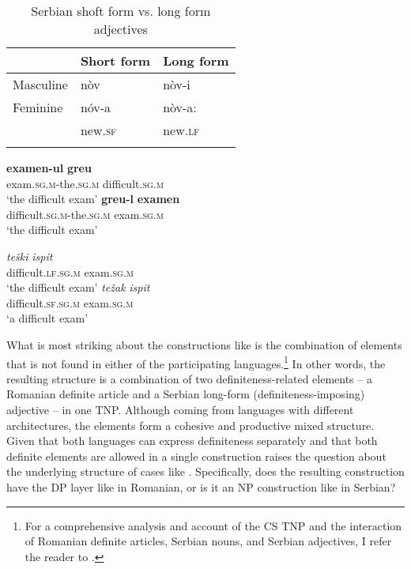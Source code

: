\documentclass[output=paper,hidelinks,newtxmath,]{langscibook}
\begin{document}
\begin{table}
    \centering
\begin{tabularx}{0.6\textwidth}{lXX}
  \lsptoprule
  & \textbf{Short form}&\textbf{Long form}\\\midrule
  Masculine & nòv & nòv-i\\
  Feminine & nóv-a & nòv-a:\\
  & new.\textsc{sf} & new.\textsc{lf}\\
  \lspbottomrule
\end{tabularx}
  \caption{Serbian shoft form vs. long form adjectives}\label{15:t1}
\end{table}


\ea \label{15:ex12}
	\ea\label{15:ex12a}
    \gll \textbf{examen-ul} \textbf{greu}\\          
        exam\textsc{.sg.m}-the\textsc{.sg.m} difficult\textsc{.sg.m}\\
	\glt `the difficult exam'
	\ex\label{15:ex12b}
    \gll \textbf{greu-l} \textbf{examen}\\
         difficult\textsc{.sg.m}-the\textsc{.sg.m} exam\textsc{.sg.m}\\ 
	\glt `the difficult exam'
	\z
\z

\ea \label{15:ex13}
	\ea\label{15:ex13a}
    \gll \textit{teški} \textit{ispit}\\          
        difficult\textsc{.lf.sg.m} exam\textsc{.sg.m}\\
        \glt `the difficult exam'
	\ex\label{15:ex13b}
    \gll \textit{težak} \textit{ispit}\\
         difficult\textsc{.sf.sg.m} exam\textsc{.sg.m}\\ 
         \glt `a difficult exam'
	\z
\z

\noindent What is most striking about the constructions like  is the combination of elements that is not found in either of the participating languages.\footnote{\label{15:fn7}For a comprehensive analysis and account of the CS TNP and the interaction of Romanian definite articles, Serbian nouns, and Serbian adjectives, I refer the reader to \citet{Petroj}.} In other words, the resulting structure is a combination of two definiteness-related elements -- a Romanian definite article and a Serbian long-form (definiteness-imposing) adjective -- in one TNP. Although coming from languages with different architectures, the elements form a cohesive and productive mixed structure. Given that both languages can express definiteness separately and that both definite elements are allowed in a single construction raises the question about the underlying structure of cases like . Specifically, does the resulting construction have the DP layer like in Romanian, or is it an NP construction like in Serbian?
\end{document}

